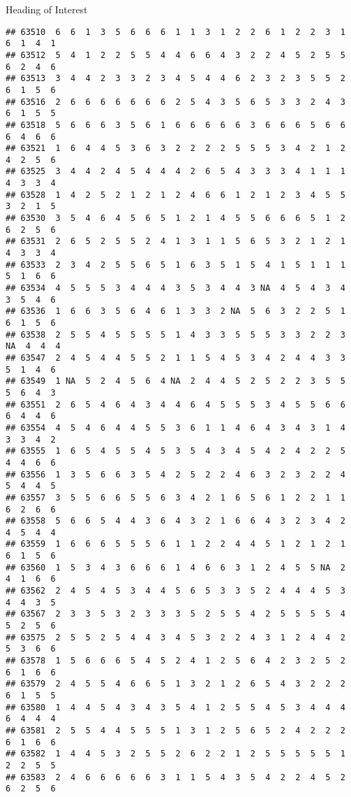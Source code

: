 \documentclass[
  ignorenonframetext,
]{beamer}
\begin{document}
\begin{frame}[fragile]{Heading of Interest}
\begin{verbatim}
## 63510  6  6  1  3  5  6  6  6  1  1  3  1  2  2  6  1  2  2  3  1  6  1  4  1
## 63512  5  4  1  2  2  5  5  4  4  6  6  4  3  2  2  4  5  2  5  5  6  2  4  6
## 63513  3  4  4  2  3  3  2  3  4  5  4  4  6  2  3  2  3  5  5  2  6  1  5  6
## 63516  2  6  6  6  6  6  6  6  2  5  4  3  5  6  5  3  3  2  4  3  6  1  5  5
## 63518  5  6  6  6  3  5  6  1  6  6  6  6  6  3  6  6  6  5  6  6  6  4  6  6
## 63521  1  6  4  4  5  3  6  3  2  2  2  2  5  5  5  3  4  2  1  2  4  2  5  6
## 63525  3  4  4  2  4  5  4  4  4  2  6  5  4  3  3  3  4  1  1  1  4  3  3  4
## 63528  1  4  2  5  2  1  2  1  2  4  6  6  1  2  1  2  3  4  5  5  3  2  1  5
## 63530  3  5  4  6  4  5  6  5  1  2  1  4  5  5  6  6  6  5  1  2  6  2  5  6
## 63531  2  6  5  2  5  5  2  4  1  3  1  1  5  6  5  3  2  1  2  1  4  3  3  4
## 63533  2  3  4  2  5  5  6  5  1  6  3  5  1  5  4  1  5  1  1  1  5  1  6  6
## 63534  4  5  5  5  3  4  4  4  3  5  3  4  4  3 NA  4  5  4  3  4  3  5  4  6
## 63536  1  6  6  3  5  6  4  6  1  3  3  2 NA  5  6  3  2  2  5  1  6  1  5  6
## 63538  2  5  5  4  5  5  5  5  1  4  3  3  5  5  5  3  3  2  2  3 NA  4  4  4
## 63547  2  4  5  4  4  5  5  2  1  1  5  4  5  3  4  2  4  4  3  3  5  1  4  6
## 63549  1 NA  5  2  4  5  6  4 NA  2  4  4  5  2  5  2  2  3  5  5  5  6  4  3
## 63551  2  6  5  4  6  4  3  4  4  6  4  5  5  5  3  4  5  5  6  6  6  4  4  6
## 63554  4  5  4  6  4  4  5  5  3  6  1  1  4  6  4  3  4  3  1  4  3  3  4  2
## 63555  1  6  5  4  5  5  4  5  3  5  4  3  4  5  4  2  4  2  2  5  4  4  6  6
## 63556  1  3  5  6  6  3  5  4  2  5  2  2  4  6  3  2  3  2  2  4  5  4  4  5
## 63557  3  5  5  6  6  5  5  6  3  4  2  1  6  5  6  1  2  2  1  1  6  2  6  6
## 63558  5  6  6  5  4  4  3  6  4  3  2  1  6  6  4  3  2  3  4  2  4  5  4  4
## 63559  1  6  6  6  5  5  5  6  1  1  2  2  4  4  5  1  2  1  2  1  6  1  5  6
## 63560  1  5  3  4  3  6  6  6  1  4  6  6  3  1  2  4  5  5 NA  2  4  1  6  6
## 63562  2  4  5  4  5  3  4  4  5  6  5  3  3  5  2  4  4  4  5  3  4  4  3  5
## 63567  2  3  3  5  3  2  3  3  3  5  2  5  5  4  2  5  5  5  5  4  5  2  5  6
## 63575  2  5  5  2  5  4  4  3  4  5  3  2  2  4  3  1  2  4  4  2  5  3  6  6
## 63578  1  5  6  6  6  5  4  5  2  4  1  2  5  6  4  2  3  2  5  2  6  1  6  6
## 63579  2  4  5  5  4  6  6  5  1  3  2  1  2  6  5  4  3  2  2  2  6  1  5  5
## 63580  1  4  4  5  4  3  4  3  5  4  1  2  5  5  4  5  3  4  4  4  6  4  4  4
## 63581  2  5  5  4  4  5  5  5  1  3  1  2  5  6  5  2  4  2  2  2  6  1  6  6
## 63582  1  4  4  5  3  2  5  5  2  6  2  2  1  2  5  5  5  5  5  1  2  2  5  5
## 63583  2  4  6  6  6  6  6  3  1  1  5  4  3  5  4  2  2  4  5  2  6  2  5  6

\end{verbatim}
\end{frame}
\end{document}
